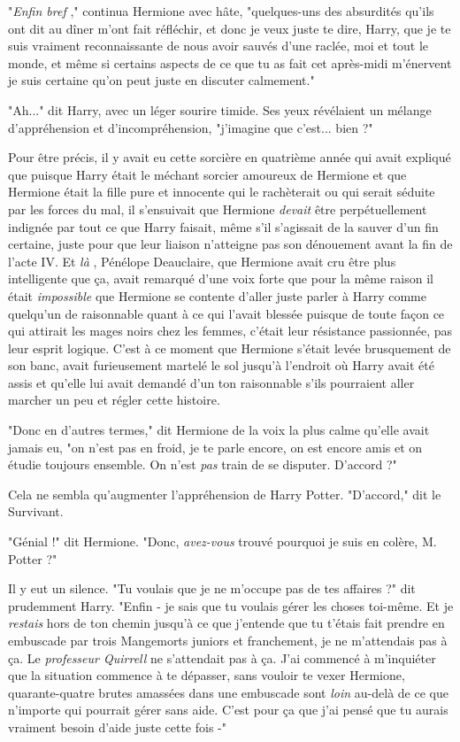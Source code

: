 "\emph{Enfin bref} ," continua Hermione avec hâte, "quelques-uns des absurdités qu'ils ont dit au dîner m'ont fait réfléchir, et donc je veux juste te dire, Harry, que je te suis vraiment reconnaissante de nous avoir sauvés d'une raclée, moi et tout le monde, et même si certains aspects de ce que tu as fait cet après-midi m'énervent je suis certaine qu'on peut juste en discuter calmement."

"Ah..." dit Harry, avec un léger sourire timide. Ses yeux révélaient un mélange d'appréhension et d'incompréhension, "j'imagine que c'est... bien ?"

Pour être précis, il y avait eu cette sorcière en quatrième année qui avait expliqué que puisque Harry était le méchant sorcier amoureux de Hermione et que Hermione était la fille pure et innocente qui le rachèterait ou qui serait séduite par les forces du mal, il s'ensuivait que Hermione \emph{devait}  être perpétuellement indignée par tout ce que Harry faisait, même s'il s'agissait de la sauver d'un fin certaine, juste pour que leur liaison n'atteigne pas son dénouement avant la fin de l'acte IV. Et \emph{là} , Pénélope Deauclaire, que Hermione avait cru être plus intelligente que ça, avait remarqué d'une voix forte que pour la même raison il était \emph{impossible}  que Hermione se contente d'aller juste parler à Harry comme quelqu'un de raisonnable quant à ce qui l'avait blessée puisque de toute façon ce qui attirait les mages noirs chez les femmes, c'était leur résistance passionnée, pas leur esprit logique. C'est à ce moment que Hermione s'était levée brusquement de son banc, avait furieusement martelé le sol jusqu'à l'endroit où Harry avait été assis et qu'elle lui avait demandé d'un ton raisonnable s'ils pourraient aller marcher un peu et régler cette histoire.

"Donc en d'autres termes," dit Hermione de la voix la plus calme qu'elle avait jamais eu, "on n'est pas en froid, je te parle encore, on est encore amis et on étudie toujours ensemble. On n'est \emph{pas}  train de se disputer. D'accord ?"

Cela ne sembla qu'augmenter l'appréhension de Harry Potter. "D'accord," dit le Survivant.

"Génial !" dit Hermione. "Donc, \emph{avez-vous}  trouvé pourquoi je suis en colère, M. Potter ?"

Il y eut un silence. "Tu voulais que je ne m'occupe pas de tes affaires ?" dit prudemment Harry. "Enfin - je sais que tu voulais gérer les choses toi-même. Et je \emph{restais}  hors de ton chemin jusqu'à ce que j'entende que tu t'étais fait prendre en embuscade par trois Mangemorts juniors et franchement, je ne m'attendais pas à ça. Le \emph{professeur Quirrell}  ne s'attendait pas à ça. J'ai commencé à m'inquiéter que la situation commence à te dépasser, sans vouloir te vexer Hermione, quarante-quatre brutes amassées dans une embuscade sont \emph{loin}  au-delà de ce que n'importe qui pourrait gérer sans aide. C'est pour ça que j'ai pensé que tu aurais vraiment besoin d'aide juste cette fois -"

